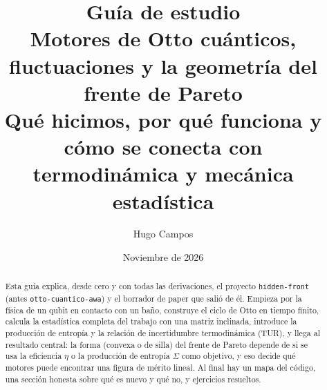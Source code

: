 \documentclass[11pt,a4paper]{article}
\title{\textbf{Guía de estudio}\\[0.3em]
\large Motores de Otto cuánticos, fluctuaciones y la geometría del frente de Pareto\\[0.2em]
\normalsize Qué hicimos, por qué funciona y cómo se conecta con termodinámica y mecánica estadística}
\author{Hugo Campos}
\date{Noviembre de 2026}
\theoremstyle{definition}
\theoremstyle{plain}
\newcommand{\code}[1]{\texttt{\small #1}}
\begin{document}
\maketitle

\begin{abstract}
\noindent Esta guía explica, desde cero y con todas las derivaciones, el proyecto
\code{hidden-front} (antes \code{otto-cuantico-awa}) y el borrador de paper que salió de él. Empieza por la física de un qubit
en contacto con un baño, construye el ciclo de Otto en tiempo finito, calcula la estadística
completa del trabajo con una matriz inclinada, introduce la producción de entropía y la relación de
incertidumbre termodinámica (TUR), y llega al resultado central: la forma (convexa o de silla) del
frente de Pareto depende de si se usa la eficiencia $\eta$ o la producción de entropía $\Sigma$ como
objetivo, y eso decide qué motores puede encontrar una figura de mérito lineal. Al final hay un
mapa del código, una sección honesta sobre qué es nuevo y qué no, y ejercicios resueltos.
\end{abstract}

\tableofcontents
\clearpage




\end{document}
